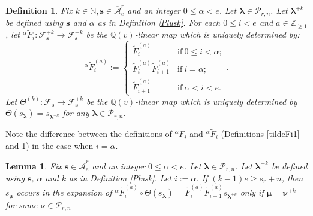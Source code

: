 \documentclass[a4paper,10pt]{amsart}
\theoremstyle{plain}
\def\bs{{\boldsymbol{s}}}
\def\N{{\mathbb N}}
\def\Z{{\mathbb Z}}
\def\Q{{\mathbb{Q}}}
\def\PP{\mathscr{P}}
\def\blam{{\boldsymbol \lambda}}
\def\bmu{{\boldsymbol \mu}}
\def\bnu{{\boldsymbol \nu}}
\theoremstyle{plain}
\newtheorem{lemma}[theorem]{Lemma}
\newtheorem{definition}[theorem]{Definition}
\numberwithin{equation}{section}
\begin{document}
\begin{definition}\label{tildeFi} Fix $k\in\N, \bs\in \overline{\mathcal A}^r_e$ and an integer $0 \le \alpha < e$. Let $\blam\in\PP_{r,n}$. Let $\blam^{+k}$ be defined using $\bs$ and $\alpha$ as in Definition \ref{Plusk}. For each $0\leq i<e$ and $a\in \Z_{\geq 1}$, let ${^\alpha}\!\tilde{F}_i: \mathcal F_\bs^{+k} \to \mathcal F_{\bs}^{+k}$ be the $\Q(v)$-linear map which is uniquely determined by:
$$
{^\alpha}\! \tilde F^{(a)}_i :=
\begin{cases}
\tilde{F}^{(a)}_i  & \text{if}\ 0\le i<\alpha; \\
\tilde{F}^{(a)}_{i} \tilde{F}^{(a)}_{i+1}  &\text{if}\ i=\alpha; \\
\tilde{F}^{(a)}_{i+1}  & \text{if}\ \alpha<i<e.
\end{cases}.
$$
Let $\varTheta^{(k)}: \mathcal F_\bs \to \mathcal F_\bs^{+k}$ be the $\Q(v)$-linear map which is uniquely determined by $\varTheta(s_\blam)=s_{\blam^{+k}}$ for any $\blam\in\PP_{r,n}$.
\end{definition}
Note the difference between the definitions of ${^\alpha}\!{F}_i$ and ${^\alpha}\!\tilde{F}_i$  (Definitions \ref{tildeFi1} and \ref{tildeFi}) in the case when $i=\alpha$.


\begin{lemma}\label{expansion+}
Fix $\bs\in \overline{\mathcal A}^r_e$ and an integer $0 \le \alpha < e$.
Let $\blam\in\PP_{r,n}$.
Let $\blam^{+k}$ be defined using $\bs$, $\alpha$ and $k$ as in Definition \ref{Plusk}.
Let $i:=\alpha$.
If \((k-1)e \ge s_r +n\), then $s_\bmu$ occurs in the expansion of ${^\alpha}\!\tilde F_i^{(a)}\circ \varTheta(s_\blam)=\tilde{F}^{(a)}_i\tilde{F}^{(a)}_{i+1} s_{\blam^{+k}}$ only if $\bmu=\bnu^{+k}$ for some $\bnu\in\PP_{r,n}$
\end{lemma}
\end{document}
